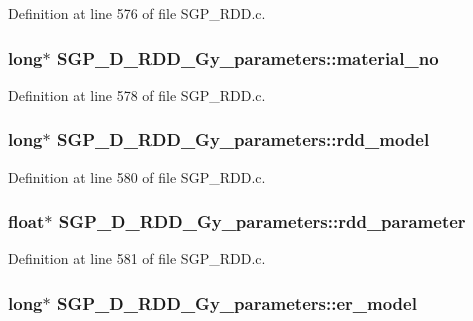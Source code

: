 Definition at line 576 of file SGP\_\-RDD.c.\hypertarget{structSGP__D__RDD__Gy__parameters_dcf05469ee1093193db8ad9875980f4f}{
\subsubsection[material\_\-no]{\setlength{\rightskip}{0pt plus 5cm}long$\ast$ {\bf SGP\_\-D\_\-RDD\_\-Gy\_\-parameters::material\_\-no}}}
\label{d8/d35/structSGP__D__RDD__Gy__parameters_dcf05469ee1093193db8ad9875980f4f}




Definition at line 578 of file SGP\_\-RDD.c.\hypertarget{structSGP__D__RDD__Gy__parameters_d16ad0b3ee2a1cfd146a2cc1995ba027}{
\subsubsection[rdd\_\-model]{\setlength{\rightskip}{0pt plus 5cm}long$\ast$ {\bf SGP\_\-D\_\-RDD\_\-Gy\_\-parameters::rdd\_\-model}}}
\label{d8/d35/structSGP__D__RDD__Gy__parameters_d16ad0b3ee2a1cfd146a2cc1995ba027}




Definition at line 580 of file SGP\_\-RDD.c.\hypertarget{structSGP__D__RDD__Gy__parameters_622064de17dd34e1f55b17d56950b038}{
\subsubsection[rdd\_\-parameter]{\setlength{\rightskip}{0pt plus 5cm}float$\ast$ {\bf SGP\_\-D\_\-RDD\_\-Gy\_\-parameters::rdd\_\-parameter}}}
\label{d8/d35/structSGP__D__RDD__Gy__parameters_622064de17dd34e1f55b17d56950b038}




Definition at line 581 of file SGP\_\-RDD.c.\hypertarget{structSGP__D__RDD__Gy__parameters_278bc39a6980a87225b119aea9131307}{
\subsubsection[er\_\-model]{\setlength{\rightskip}{0pt plus 5cm}long$\ast$ {\bf SGP\_\-D\_\-RDD\_\-Gy\_\-parameters::er\_\-model}}}
\label{d8/d35/structSGP__D__RDD__Gy__parameters_278bc39a6980a87225b119aea9131307}




